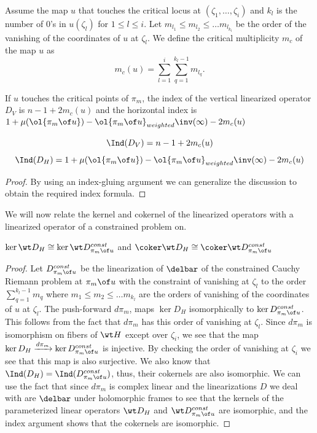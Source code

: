 \noindent  Assume the map $u$ that touches the critical locus at $(\zeta_1,\dots,\zeta_i)$ and $k_l$ is the number of 0's in $u(\zeta_l)$ for $1\leq l \leq i$. Let $m_{l_1} \leq m_{l_2} \leq \dots m_{l_{k_l}}$ be the order of the vanishing of the coordinates of $u$ at $\zeta_l$. We define the critical multiplicity $m_c$ of the map $u$ as $$m_c(u)=\sum_{l=1}^i\sum_{q=1}^{k_l-1} m_{l_q}.$$


\begin{lemma}\label{lemm:vertcrit}
If $u$ touches the critical points of $\pi_m$, the index of the vertical linearized operator $D_V$ is  $n-1 + 2m_c(u)$ and the horizontal index is $1 + \mu(\ol{\pi_m \of u}) - \ol{\pi_m \of u}_{weighted}\inv (\infty) - 2m_c(u) $

$$\Ind (D_V) = n-1 + 2m_c(u)$$
$$\Ind (D_H) = 1 + \mu(\ol{\pi_m \of u}) - \ol{\pi_m \of u}_{weighted}\inv (\infty) - 2m_c(u)$$
\end{lemma}
\begin{proof}
    By using an index-gluing argument we can generalize the discussion to obtain the required index formula.
\end{proof}


We will now relate the kernel and cokernel of the linearized operators with a linearized operator of a constrained problem on. 

\begin{lemma}\label{lemm:horiden}
$\ker \wt D_H \cong \ker \wt D^{const}_{\pi_m \of u} $ and 
$\coker \wt D_H \cong \coker \wt D^{const}_{\pi_m \of u} $
\end{lemma}
\begin{proof}
Let $D^{const}_{\pi_m \of u}$ be the linearization of $\delbar$ of the constrained Cauchy Riemann problem at $\pi_m \of u$ with the constraint of vanishing at $\zeta_l$ to the order $\sum_{q=1}^{k_l-1} m_q$ where $m_1 \leq m_2 \leq \dots m_{k_l}$ are the orders of vanishing of the coordinates of $u$ at $\zeta_l$.
The push-forward $d\pi_m$, maps $\ker D_H$ isomorphically to $\ker D^{const}_{\pi_m \of u}$. This follows from the fact that $d\pi_m$ has this order of vanishing at $\zeta_l$. Since $d\pi_m$ is isomorphism on fibers of $\wt H$ except over $\zeta_i$, we see that the map $\ker D_H \xrightarrow{d\pi_m} \ker D^{const}_{\pi_m \of u}$ is injective. By checking the order of vanishing at $\zeta_i$ we see that this map is also surjective. We also know that $\Ind (D_H) = \Ind (D^{const}_{\pi_m \of u})$, thus, their cokernels are also isomorphic. We can use the fact that since $d\pi_m$ is complex linear and the linearizations $D$ we deal with are $\delbar$ under holomorphic frames to see that the kernels of the parameterized linear operators $\wt  D_H$ and $\wt D^{const}_{\pi_m \of u}$ are isomorphic, and the index argument shows that the cokernels are isomorphic. 
\end{proof}

